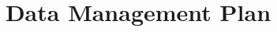 \documentclass[preprint]{aastex}
\begin{document}
\title{Data Management Plan}

% 
% 
% 
% 
% 



% 
\end{document}
